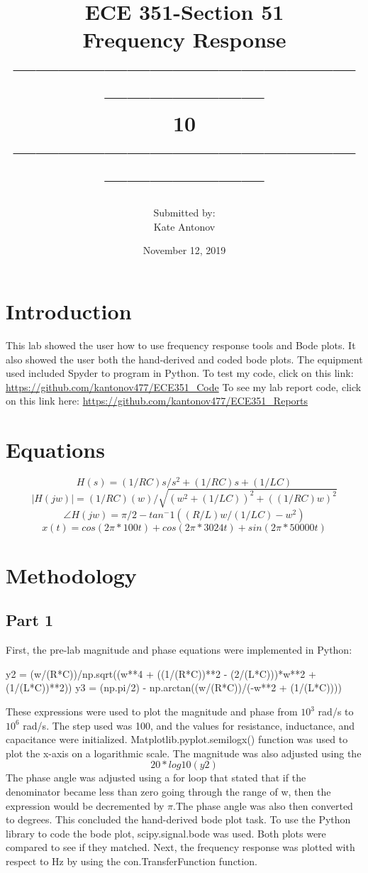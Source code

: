 \documentclass[12pt]{article}
\title{ECE 351-Section 51 \\ Frequency Response
 \\ ------------------------------------------------------------------\\ 10 \\------------------------------------------------------------------}
\author{Submitted by: \\  Kate Antonov}
\date{November 12, 2019}
\begin{document}
\vspace{\fill}

\maketitle

\vspace{\fill}
\thispagestyle{empty}
\clearpage

\clearpage
\thispagestyle{empty}
\tableofcontents
\clearpage

\section{Introduction}
This lab showed the user how to use frequency response tools and Bode plots. It also showed the user both the hand-derived and coded bode plots.
\newline
The equipment used included Spyder to program in Python. To test my code, click on this link: 
\url{https://github.com/kantonov477/ECE351_Code}
\newline
To see my lab report code, click on this link here: 
\url{https://github.com/kantonov477/ECE351_Reports}
\section{Equations}
\[H(s) = (1/RC)s/s^2 + (1/RC)s + (1/LC)\]
\[|H(jw)| = (1/RC)(w)/\sqrt{(w^2 + (1/LC))^2 + ((1/RC)w)^2}\]
\[\angle H(jw) = \pi/2 - tan^-1((R/L)w/(1/LC)-w^2)\]
\[x(t) = cos(2\pi * 100t) + cos(2\pi * 3024t) + sin(2\pi * 50000t)\]
\section{Methodology}
\subsection{Part 1}
First, the pre-lab magnitude and phase equations were implemented in Python:
\begin{python}
y2 = (w/(R*C))/np.sqrt((w**4 + ((1/(R*C))**2 - (2/(L*C)))*w**2 + (1/(L*C))**2))
y3 = (np.pi/2) - np.arctan((w/(R*C))/(-w**2 + (1/(L*C))))
\end{python}
These expressions were used to plot the magnitude and phase from $10^3$ rad/s to $10^6$ rad/s. The step used was 100, and the values for resistance, inductance, and capacitance were initialized. Matplotlib.pyplot.semilogx() function was used to plot the x-axis on a logarithmic scale. The magnitude was also adjusted using the 
\[20*log10(y2)\]
The phase angle  was adjusted using a for loop that stated that if the denominator became less than zero going through the range of w, then the expression would be decremented by $\pi$.The phase angle was also then converted to degrees. This concluded the hand-derived bode plot task.\newline
To use the Python library to code the bode plot, scipy.signal.bode was used. Both plots were compared to see if they matched. Next, the frequency response was plotted with respect to Hz by using the con.TransferFunction function.
\end{document}
